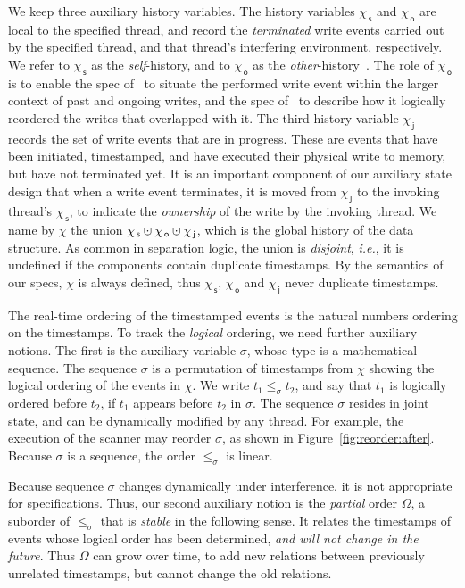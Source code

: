 \documentclass[a4paper,UKenglish]{lipics-v2016}
\newcommand{\ie}{\emph{i.e.}\xspace}
\newcommand{\dotcup}{\ensuremath{\mathaccent\cdot\cup}}
\newcommand{\selfsub}{\mathsf{s}}
\newcommand{\othersub}{\mathsf{o}}
\newcommand{\jointsub}{\mathsf{j}}
\newcommand{\hist}{\chi}
\newcommand{\histS}{\hist_{\, \selfsub}}
\newcommand{\histO}{\hist_{\, \othersub}}
\newcommand{\histJ}{\hist_{\, \jointsub}}
\newcommand{\hunion}{\mathbin{\dotcup}}
\def\ordlist{\sigma}
\newcommand{\tleq}{\mathrel{\leq_\ordlist}}
\newcommand{\stableorder}{\Omega}
\theoremstyle{definition}
\begin{document}
We keep three auxiliary history variables. The history variables
$\histS$ and $\histO$ are local to the specified thread, and record
the \emph{terminated} write events carried out by the specified
thread, and that thread's interfering environment, respectively. We
refer to $\histS$ as the \emph{self}-history, and to $\histO$ as the
\emph{other}-history~\cite{LeyWildN+POPL13,NanevskiLSD+ESOP14,Nanevski+OPLSS16,SergeyNB+ESOP15}. The
role of $\histO$ is to enable the spec of \jywrite\ to situate the
performed write event within the larger context of past and ongoing
writes, and the spec of \jyscan\ to describe how it logically
reordered the writes that overlapped with it.
%
The third history variable $\histJ$ records the set of write events
that are in progress. These are events that have been initiated,
timestamped, and have executed their physical write to memory, but
have not terminated yet. It is an important component of our auxiliary
state design that when a write event terminates, it is moved from
$\histJ$ to the invoking thread's $\histS$, to indicate the
\emph{ownership} of the write by the invoking thread.
%
We name by $\hist$ the union $\histS \hunion \histO \hunion \histJ$,
which is the global history of the data structure. As common in
separation logic, the union is \emph{disjoint}, \ie, it is undefined
if the components contain duplicate timestamps. By the semantics of
our specs, $\hist$ is always defined, thus $\histS$, $\histO$ and
$\histJ$ never duplicate timestamps.

The real-time ordering of the timestamped events is the natural
numbers ordering on the timestamps. To track the \emph{logical}
ordering, we need further auxiliary notions.
%
The first is the auxiliary variable $\ordlist$, whose type is a
mathematical sequence. The sequence $\ordlist$ is a permutation of
timestamps from $\hist$ showing the logical ordering of the events in
$\hist$. We write $t_1 \tleq t_2$, and say that $t_1$ is logically
ordered before $t_2$, if $t_1$ appears before $t_2$ in $\ordlist$. The
sequence $\ordlist$ resides in joint state, and can be dynamically
modified by any thread. For example, the execution of the scanner may
reorder $\ordlist$, as shown in
Figure~\ref{fig:reorder:after}. Because $\ordlist$ is a sequence, the
order $\tleq$ is linear.

%
%

Because sequence $\ordlist$ changes dynamically under interference, it
is not appropriate for specifications. Thus, our second auxiliary
notion is the \emph{partial} order $\stableorder$, a suborder of
$\tleq$ that is \emph{stable} in the following sense. It relates the
timestamps of events whose logical order has been determined,
\emph{and will not change in the future}. Thus $\stableorder$ can grow
over time, to add new relations between previously unrelated
timestamps, but cannot change the old relations.
\end{document}
